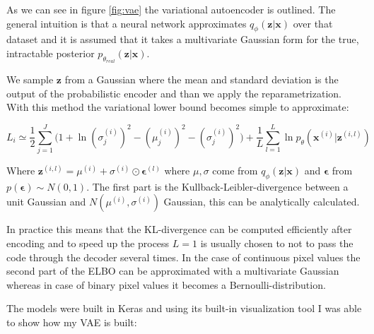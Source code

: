 \documentclass[11pt, english]{article}
\begin{document}
\vspace{3mm}

\par As we can see in figure \ref{fig:vae} the variational autoencoder is outlined. The general intuition is that a neural network approximates $q_{\phi}(\bm{z} | \bm{x})$ over that dataset and it is assumed that it takes a multivariate Gaussian form for the true, intractable posterior $p_{\theta_{real}}(\bm{z} | \bm{x})$.

\vspace{3mm}

\par We sample $\bm{z}$ from a Gaussian where the mean and standard deviation is the output of the probabilistic encoder and than we apply the reparametrization. With this method the variational lower bound becomes simple to approximate:

\vspace{3mm}

\begin{equation}
    L_{i} \simeq \frac{1}{2}\sum_{j = 1}^{J}\Big( 1 + \ln(\sigma^{(i)}_{j})^{2} - (\mu^{(i)}_{j})^{2} - (\sigma^{(i)}_{j})^{2} \Big) + \frac{1}{L}\sum_{l=1}^{L}\ln p_{\theta}(\bm{x}^{(i)} | \bm{z}^{(i, l)})
\end{equation}

\vspace{3mm}

\par Where $\bm{z}^{(i, l)} = \mu^{(i)} + \sigma^{(i)} \odot \bm{\epsilon}^{(l)}$ where $\mu, \sigma$ come from $q_{\phi}(\bm{z} | \bm{x})$ and $\bm{\epsilon}$ from $p(\bm{\epsilon}) \sim N(0, 1)$. The first part is the Kullback-Leibler-divergence between a unit Gaussian and $N(\mu^{(i)}, \sigma^{(i)})$ Gaussian, this can be analytically calculated.

\vspace{3mm}

\par In practice this means that the KL-divergence can be computed efficiently after encoding and to speed up the process $L = 1$ is usually chosen to not to pass the code through the decoder several times. In the case of continuous pixel values the second part of the ELBO can be approximated with a multivariate Gaussian whereas in case of binary pixel values it becomes a Bernoulli-distribution. 

\vspace{3mm}

\par The models were built in Keras \cite{chollet2015keras} and using its built-in visualization tool I was able to show how my VAE is built:
\end{document}

